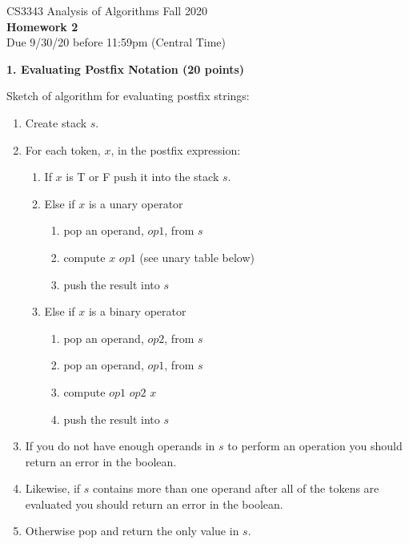 \documentclass[12pt]{elsart}
\begin{document}
\pagestyle{empty}

\begin{center}
\Large  CS3343 Analysis of Algorithms Fall 2020 \\
\large {\bf Homework 2}\\
\normalsize Due 9/30/20 before 11:59pm (Central Time)
\end{center}

{\bf 1. Evaluating Postfix Notation (20 points)}

Sketch of algorithm for evaluating postfix strings:

\begin{enumerate}
   \item Create stack $s$.
   \item For each token, $x$, in the postfix expression:
\begin{enumerate}[label=\arabic*]
   \item If $x$ is T or F push it into the stack $s$.
   \item Else if $x$ is a unary operator
\begin{enumerate}[label=\roman*]
   \item pop an operand, $op1$, from $s$
   \item compute $x$ $op1$ (see unary table below)
   \item push the result into $s$
\end{enumerate}
   \item Else if $x$ is a binary operator
\begin{enumerate}[label=\roman*]
   \item pop an operand, $op2$, from $s$
   \item pop an operand, $op1$, from $s$
   \item compute $op1$ $op2$ $x$ 
   \item push the result into $s$
\end{enumerate}
\end{enumerate}
   \item If you do not have enough operands in $s$ to perform an operation you should return an error in the boolean.
   \item Likewise, if $s$ contains more than one operand after all of the tokens are evaluated you should return an error in the boolean.
   \item Otherwise pop and return the only value in $s$.
\end{enumerate}
\end{document}

